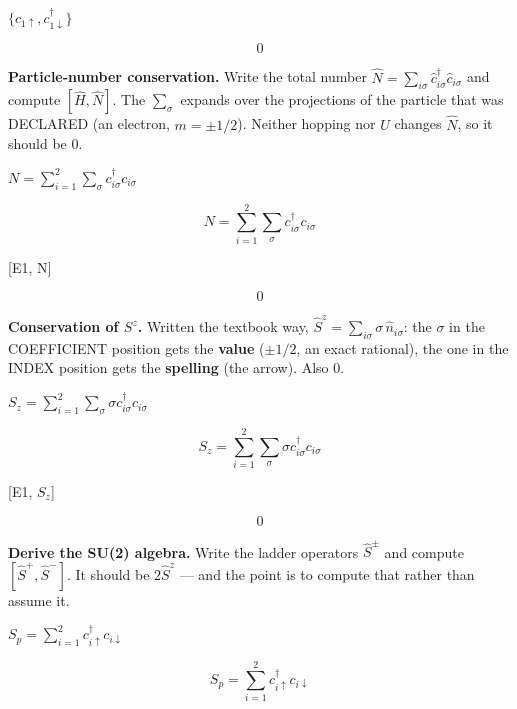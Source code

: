 \documentclass[dvipdfmx]{article}
\begin{document}
$\{c_{1\uparrow}, c^\dagger_{1\downarrow}\}$

\begin{equation}
  0
  \label{eq:E4}
\end{equation}

\textbf{Particle-number conservation.} Write the total number $\hat N=\sum_{i\sigma}\hat c^\dagger_{i\sigma}\hat c_{i\sigma}$ and compute $[\hat H,\hat N]$. The $\sum_\sigma$ expands over the projections of the particle that was DECLARED (an electron, $m=\pm1/2$). Neither hopping nor $U$ changes $\hat N$, so it should be 0.

$N = \sum_{i=1}^{2} \sum_{\sigma} c^\dagger_{i\sigma} c_{i\sigma}$

\begin{equation}
  N = \sum_{i=1}^{2} \sum_{\sigma} c^\dagger_{i\sigma} c_{i\sigma}
  \label{eq:E5}
\end{equation}

[E1, N]

\begin{equation}
  0
  \label{eq:E6}
\end{equation}

\textbf{Conservation of $S^z$.} Written the textbook way, $\hat S^z=\sum_{i\sigma}\sigma\,\hat n_{i\sigma}$: the $\sigma$ in the COEFFICIENT position gets the \textbf{value} ($\pm1/2$, an exact rational), the one in the INDEX position gets the \textbf{spelling} (the arrow). Also 0.

$S_z = \sum_{i=1}^{2} \sum_{\sigma} \sigma c^\dagger_{i\sigma} c_{i\sigma}$

\begin{equation}
  S_z = \sum_{i=1}^{2} \sum_{\sigma} \sigma c^\dagger_{i\sigma} c_{i\sigma}
  \label{eq:E7}
\end{equation}

[E1, $S_z$]

\begin{equation}
  0
  \label{eq:E8}
\end{equation}

\textbf{Derive the SU(2) algebra.} Write the ladder operators $\hat S^\pm$ and compute $[\hat S^+,\hat S^-]$. It should be $2\hat S^z$ — and the point is to compute that rather than assume it.

$S_p = \sum_{i=1}^{2} c^\dagger_{i\uparrow} c_{i\downarrow}$

\begin{equation}
  S_p = \sum_{i=1}^{2} c^\dagger_{i\uparrow} c_{i\downarrow}
  \label{eq:E9}
\end{equation}
\end{document}
